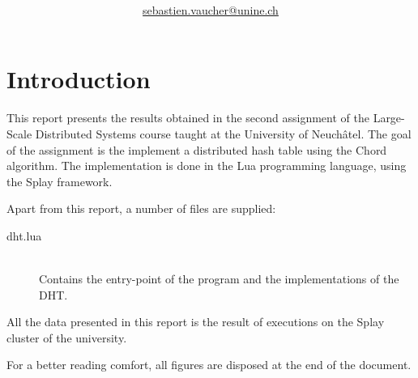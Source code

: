 \documentclass[11pt,a4paper]{scrartcl}
\author{\myauthor\\ \href{mailto:sebastien.vaucher@unine.ch}{sebastien.vaucher@unine.ch}}
\title{\huge \textbf{\mytitle}}
\begin{document}
\nocite{*}

\begin{titlingpage}

\begin{otherlanguage}{australian}
\maketitle
\end{otherlanguage}

\tableofcontents

\begin{table}[b]
\centering
{}
\qquad\qquad
{}
\end{table}

\end{titlingpage}

\pagebreak

\section{Introduction}

This report presents the results obtained in the second assignment of the Large-Scale Distributed Systems course taught at the University of Neuchâtel. The goal of the assignment is the implement a distributed hash table using the Chord algorithm. The implementation is done in the Lua programming language, using the Splay framework.

Apart from this report, a number of files are supplied:

\begin{description}
\item[dht.lua]\hfill\\ Contains the entry-point of the program and the implementations of the DHT.
\end{description}

All the data presented in this report is the result of executions on the Splay cluster of the university.

For a better reading comfort, all figures are disposed at the end of the document.



\end{document}
